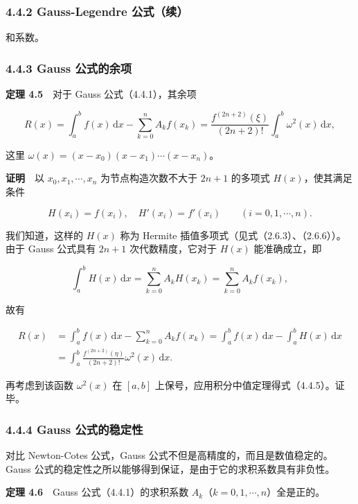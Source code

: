 \documentclass[
  10pt,
  fontset=fandol]{ctexart}
\begin{document}
\subsubsection{4.4.2 Gauss-Legendre 公式（续）}\label{gauss-legendre-ux516cux5f0fux7eed}

和系数。

\subsubsection{4.4.3 Gauss 公式的余项}\label{gauss-ux516cux5f0fux7684ux4f59ux9879}

\textbf{定理 4.5}　对于 Gauss 公式（4.4.1），其余项

\[
R(x)=\int_a^b f(x)\,\mathrm{d}x-\sum_{k=0}^{n}A_kf(x_k)
=\frac{f^{(2n+2)}(\xi)}{(2n+2)!}\int_a^b\omega^2(x)\,\mathrm{d}x,
\tag{4.4.5}
\]

这里 \(\omega(x)=(x-x_0)(x-x_1)\cdots(x-x_n)\)。

\textbf{证明}　以 \(x_0,x_1,\cdots,x_n\) 为节点构造次数不大于 \(2n+1\) 的多项式 \(H(x)\)，使其满足条件

\[
H(x_i)=f(x_i),\quad H'(x_i)=f'(x_i)\qquad(i=0,1,\cdots,n).
\]

我们知道，这样的 \(H(x)\) 称为 Hermite 插值多项式（见式（2.6.3）、（2.6.6））。由于 Gauss 公式具有 \(2n+1\) 次代数精度，它对于 \(H(x)\) 能准确成立，即

\[
\int_a^b H(x)\,\mathrm{d}x
=\sum_{k=0}^{n}A_kH(x_k)=\sum_{k=0}^{n}A_kf(x_k),
\]

故有

\[
\begin{aligned}
R(x)&=\int_a^b f(x)\,\mathrm{d}x-\sum_{k=0}^{n}A_kf(x_k)
=\int_a^b f(x)\,\mathrm{d}x-\int_a^b H(x)\,\mathrm{d}x\\
&=\int_a^b\frac{f^{(2n+2)}(\eta)}{(2n+2)!}\omega^2(x)\,\mathrm{d}x.
\end{aligned}
\]

再考虑到该函数 \(\omega^2(x)\) 在 \([a,b]\) 上保号，应用积分中值定理得式（4.4.5）。证毕。

\subsubsection{4.4.4 Gauss 公式的稳定性}\label{gauss-ux516cux5f0fux7684ux7a33ux5b9aux6027}

对比 Newton-Cotes 公式，Gauss 公式不但是高精度的，而且是数值稳定的。Gauss 公式的稳定性之所以能够得到保证，是由于它的求积系数具有非负性。

\textbf{定理 4.6}　Gauss 公式（4.4.1）的求积系数 \(A_k\)（\(k=0,1,\cdots,n\)）全是正的。
\end{document}
